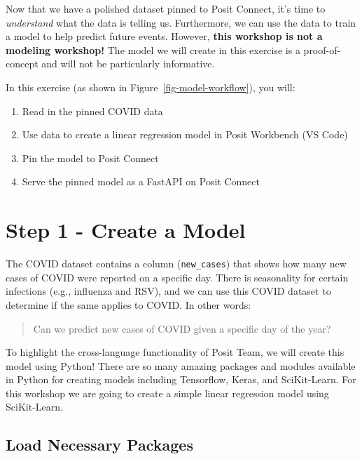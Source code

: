 \documentclass[
  letterpaper,
  DIV=11,
  numbers=noendperiod]{scrreprt}
\providecommand{\tightlist}{%
  \setlength{\itemsep}{0pt}\setlength{\parskip}{0pt}}\usepackage{longtable,booktabs,array}
\begin{document}
Now that we have a polished dataset pinned to Posit Connect, it's time
to \emph{understand} what the data is telling us. Furthermore, we can
use the data to train a model to help predict future events. However,
\textbf{this workshop is not a modeling workshop!} The model we will
create in this exercise is a proof-of-concept and will not be
particularly informative.

In this exercise (as shown in Figure~\ref{fig-model-workflow}), you
will:

\begin{enumerate}
\def\labelenumi{\arabic{enumi}.}
\tightlist
\item
  Read in the pinned COVID data
\item
  Use data to create a linear regression model in Posit Workbench (VS
  Code)
\item
  Pin the model to Posit Connect
\item
  Serve the pinned model as a FastAPI on Posit Connect
\end{enumerate}

\section{Step 1 - Create a Model}\label{step-1---create-a-model}

The COVID dataset contains a column (\texttt{new\_cases}) that shows how
many new cases of COVID were reported on a specific day. There is
seasonality for certain infections (e.g., influenza and RSV), and we can
use this COVID dataset to determine if the same applies to COVID. In
other words:

\begin{quote}
Can we predict new cases of COVID given a specific day of the year?
\end{quote}

To highlight the cross-language functionality of Posit Team, we will
create this model using Python! There are so many amazing packages and
modules available in Python for creating models including Tensorflow,
Keras, and SciKit-Learn. For this workshop we are going to create a
simple linear regression model using SciKit-Learn.

\subsection{Load Necessary Packages}\label{load-necessary-packages-1}
\end{document}
